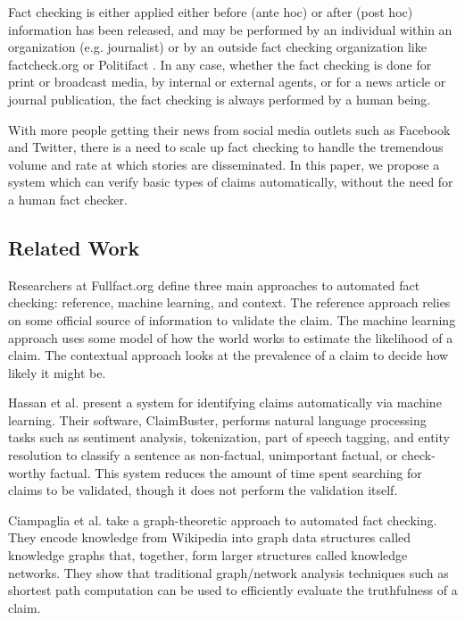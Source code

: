 \documentclass{chi2009}
\begin{document}
Fact checking is either applied either before (ante hoc) or after (post hoc) information has been released, and may be performed by an individual within an organization (e.g. journalist) or by an outside fact checking organization like factcheck.org \cite{factcheck} or Politifact \cite{politifact}.  In any case, whether the fact checking is done for print or broadcast media, by internal or external agents, or for a news article or journal publication, the fact checking is always performed by a human being.  

With more people getting their news from social media outlets such as Facebook and Twitter, there is a need to scale up fact checking to handle the tremendous volume and rate at which stories are disseminated.  In this paper, we propose a system which can verify basic types of claims automatically, without the need for a human fact checker.

\subsection{Related Work}
Researchers at Fullfact.org \cite{babakar_moy_2016} define three main approaches to automated fact checking: reference, machine learning, and context.  The reference approach relies on some official source of information to validate the claim.  The machine learning approach uses some model of how the world works to estimate the likelihood of a claim.  The contextual approach looks at the prevalence of a claim to decide how likely it might be.

Hassan et al. \cite{hassan2015quest} present a system for identifying claims automatically via machine learning.  Their software, ClaimBuster, performs natural language processing tasks such as sentiment analysis, tokenization, part of speech tagging, and entity resolution to classify a sentence as non-factual, unimportant factual, or check-worthy factual.  This system reduces the amount of time spent searching for claims to be validated, though it does not perform the validation itself.  

Ciampaglia et al. \cite{ciampaglia2015computational} take a graph-theoretic approach to automated fact checking.  They encode knowledge from Wikipedia into graph data structures called knowledge graphs that, together, form larger structures called knowledge networks.  They show that traditional graph/network analysis techniques such as shortest path computation can be used to efficiently evaluate the truthfulness of a claim.
\end{document}
